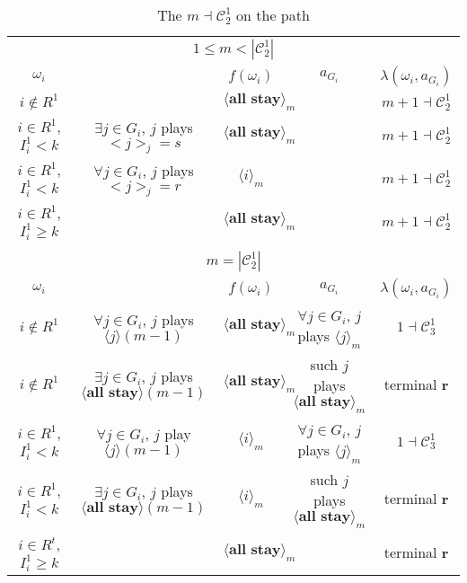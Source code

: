\documentclass[12pt,letter]{article}
\newcommand{\Kappa}{\mathcal{C}}
\theoremstyle{definition}
\theoremstyle{remark}
\theoremstyle{claim}
\begin{document}
\begin{landscape}
\begin{table}[!htbp]
\caption{The $m\dashv\Kappa^1_{2}$ on the path}
\label{table:eqm_path_k02}
\begin{center}
\begin{tabular}{c c | c | c | c}
\multicolumn{5}{c}{$1\leq m < |\Kappa^1_2|$}\\
$\omega_i$ 	 & 	   &	$f(\omega_i)$  &	$a_{G_i}$ & $\lambda(\omega_i,a_{G_i})$ \\
\hline
\hline
$i\notin R^1$  	& & $\langle \textbf{all stay} \rangle_m$	&    & $m+1\dashv \Kappa^1_{2}$\\
$i\in R^1$, $I^1_i< k$  	& $\exists j\in G_i$, $j$ plays $<j>_j=s$	& $\langle \textbf{all stay} \rangle_m$	& 	& $m+1\dashv \Kappa^1_{2}$\\
$i\in R^1$, $I^1_i< k$  	& $\forall j\in G_i$, $j$ plays $<j>_j=r$ 	& $\langle i \rangle_m$	& 	& $m+1\dashv \Kappa^1_{2}$\\
$i\in R^1$, $I^1_i\geq k$  	& 	& $\langle \textbf{all stay} \rangle_m$	&	& $m+1\dashv \Kappa^1_{2}$\\
\hline
\\
\multicolumn{5}{c}{$m= |\Kappa^1_2|$}\\
$\omega_i$ 	 & 	   &	$f(\omega_i)$  &	$a_{G_i}$ & $\lambda(\omega_i,a_{G_i})$ \\
\hline
\hline
$i\notin R^1$  	& $\forall j\in G_i$, $j$ plays $\langle j \rangle(m-1)$    & $\langle \textbf{all stay} \rangle_m$	& $\forall j\in G_i$, $j$ plays $\langle j \rangle_m$	& $1\dashv \Kappa^1_{3}$\\
$i\notin R^1$  	& $\exists j\in G_i$, $j$ plays $\langle \textbf{all stay} \rangle(m-1)$   & $\langle \textbf{all stay} \rangle_m$	& such $j$ plays $\langle \textbf{all stay} \rangle_m$	& terminal \textbf{r}\\
$i\in R^1$, $I^1_i< k$   	& $\forall j\in G_i$, $j$ play $\langle j \rangle(m-1)$ 	& $\langle i \rangle_m$	&  $\forall j\in G_i$, $j$ plays $\langle j \rangle_m$	& $1\dashv \Kappa^1_{3}$ \\
$i\in R^1$, $I^1_i< k$   	&  $\exists j\in G_i$, $j$ plays $\langle \textbf{all stay} \rangle(m-1)$ 	& $\langle i \rangle_m$	& such $j$ plays $\langle \textbf{all stay} \rangle_m$	&  terminal \textbf{r}\\
$i\in R^t$, $I^1_i\geq k$  	& 	& $\langle \textbf{all stay} \rangle_m$	& 	& terminal \textbf{r} \\
\hline
\end{tabular}
\end{center}
\end{table}

\end{landscape}
\end{document}
